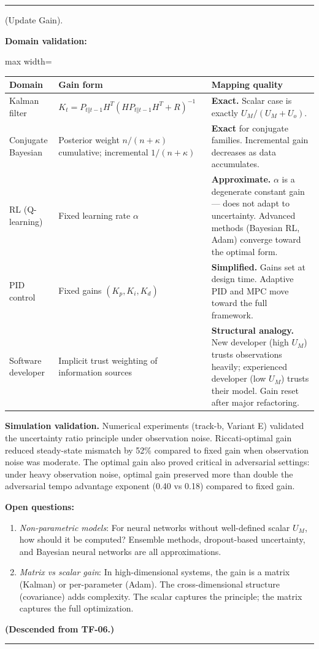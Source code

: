 \documentclass[11pt,oneside]{article}
\newcounter{claim}[section]
\renewcommand{\theclaim}{\thesection.\arabic{claim}}
\newenvironment{segment}[2]{%
  \refstepcounter{claim}%
  \bigskip\noindent\hrule\smallskip
  \noindent{\bfseries #1~\theclaim}\enskip(#2).\par\smallskip
  \noindent\ignorespaces
}{%
  \par\smallskip\noindent\hrule\bigskip
}
\newenvironment{empirical}[1][]{\begin{segment}{Empirical}{#1}}{\end{segment}}
\begin{document}
\begin{empirical}[Update Gain]
\textbf{Domain validation:}

\begin{adjustbox}{max width=\textwidth}
\small
\begin{tabular}{lll}
\toprule
Domain & Gain form & Mapping quality \\
\midrule
Kalman filter & $K_t = P_{t\Vert t-1} H^T (H P_{t\Vert t-1} H^T + R)^{-1}$ & \textbf{Exact.} Scalar case is exactly $U_M/(U_M + U_o)$. \\
Conjugate Bayesian & Posterior weight $n/(n + \kappa)$ cumulative; incremental $1/(n + \kappa)$ & \textbf{Exact} for conjugate families. Incremental gain decreases as data accumulates. \\
RL (Q-learning) & Fixed learning rate $\alpha$ & \textbf{Approximate.} $\alpha$ is a degenerate constant gain — does not adapt to uncertainty. Advanced methods (Bayesian RL, Adam) converge toward the optimal form. \\
PID control & Fixed gains $(K_p, K_i, K_d)$ & \textbf{Simplified.} Gains set at design time. Adaptive PID and MPC move toward the full framework. \\
Software developer & Implicit trust weighting of information sources & \textbf{Structural analogy.} New developer (high $U_M$) trusts observations heavily; experienced developer (low $U_M$) trusts their model. Gain reset after major refactoring. \\
\bottomrule
\end{tabular}
\end{adjustbox}


\textbf{Simulation validation.} Numerical experiments (track-b, Variant E) validated the uncertainty ratio principle under observation noise. Riccati-optimal gain reduced steady-state mismatch by 52\% compared to fixed gain when observation noise was moderate. The optimal gain also proved critical in adversarial settings: under heavy observation noise, optimal gain preserved more than double the adversarial tempo advantage exponent (0.40 vs 0.18) compared to fixed gain.

\textbf{Open questions:}

\begin{enumerate}
  \item \textit{Non-parametric models}: For neural networks without well-defined scalar $U_M$, how should it be computed? Ensemble methods, dropout-based uncertainty, and Bayesian neural networks are all approximations.
  \item \textit{Matrix vs scalar gain}: In high-dimensional systems, the gain is a matrix (Kalman) or per-parameter (Adam). The cross-dimensional structure (covariance) adds complexity. The scalar captures the principle; the matrix captures the full optimization.
\end{enumerate}


\textbf{(Descended from TF-06.)}
\end{empirical}
\end{document}

